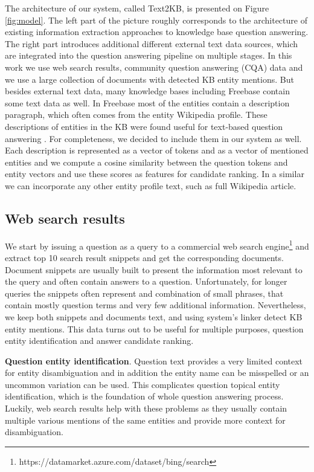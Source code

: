 
The architecture of our system, called Text2KB, is presented on Figure \ref{fig:model}. 
The left part of the picture roughly corresponds to the architecture of existing information extraction approaches to knowledge base question answering.
The right part introduces additional different external text data sources, which are integrated into the question answering pipeline on multiple stages.
In this work we use web search results, community question answering (CQA) data and we use a large collection of documents with detected KB entity mentions.
But besides external text data, many knowledge bases including Freebase contain some text data as well.
In Freebase most of the entities contain a description paragraph, which often comes from the entity Wikipedia profile.
These descriptions of entities in the KB were found useful for text-based question answering \cite{Sun:2015:ODQ:2736277.2741651}.
For completeness, we decided to include them in our system as well.
Each description is represented as a vector of tokens and as a vector of mentioned entities and we compute a cosine similarity between the question tokens and entity vectors and use these scores as features for candidate ranking.
In a similar we can incorporate any other entity profile text, such as full Wikipedia article.

\subsection{Web search results}
\label{section:method:web}

We start by issuing a question as a query to a commercial web search engine\footnote{https://datamarket.azure.com/dataset/bing/search} and extract top 10 search result snippets and get the corresponding documents.
Document snippets are usually built to present the information most relevant to the query and often contain answers to a question.
Unfortunately, for longer queries the snippets often represent and combination of small phrases, that contain mostly question terms and very few additional information.
Nevertheless, we keep both snippets and documents text, and using system's linker detect KB entity mentions.
This data turns out to be useful for multiple purposes, \ie question entity identification and answer candidate ranking.

\textbf{Question entity identification}.
Question text provides a very limited context for entity disambiguation and in addition the entity name can be misspelled or an uncommon variation can be used.
This complicates question topical entity identification, which is the foundation of whole question answering process.
Luckily, web search results help with these problems as they usually contain multiple various mentions of the same entities and provide more context for disambiguation.

